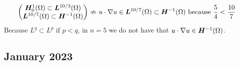 \begin{itemize}
    \[
        \begin{pmatrix*}
            \bm{H}^1_0(\Omega) \subset \bm{L}^{10/3}{(\Omega)}  \\
            \bm{L}^{10/7}(\Omega) \subset \bm{H}^{-1}(\Omega)
        \end{pmatrix*}
        \nRightarrow u \cdot \grad u \in \bm{L}^{10/7}(\Omega) \subset \bm{H}^{-1}(\Omega) \text{ because } \frac{5}{4} < \frac{10}{7}
    \]
    Because \(L^q \subset L^p\) if \(p < q\), in \(n = 5\) we do not have that \(u \cdot \nabla u \in \bm{H}^{-1}(\Omega)\).
\end{itemize}

\newpage
\subsection{January 2023}
